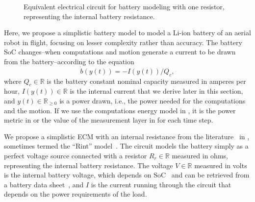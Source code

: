 \begin{figure}[h!]
  \sfr
  \centering
  \selectfont
  
  \caption[Equivalent electrical circuit for battery modeling with an internal resistance]{Equivalent electrical circuit for battery modeling with one resistor, representing the internal battery resistance.}
  \label{fig:rint}
  \efr
\end{figure}
Here, we propose a simplistic battery model to model a Li-ion battery of an aerial robot in flight, focusing on lesser complexity rather than accuracy. The battery SoC changes--when computations and motion generate a current to be drawn from the battery--according to the equation~\citep{zhang2018online,hasan2018exogenous}
\begin{equation}\label{eq:socevol}
  \dot{b}(y(t))=-I(y(t))/Q_c,
\end{equation}
where $Q_c\in\mathbb{R}$ is the battery constant nominal capacity measured in amperes per hour, $I(y(t))\in\mathbb{R}$ is the internal current that we derive later in this section, and $y(t)\in\mathbb{R}_{\geq 0}$ is a power drawn, i.e., the power needed for the computations and the motion. 
If we use the computations energy model in , it is the power metric in  or the value of the measurement layer in  for each time step.

We propose a simplistic ECM with an internal resistance from the literature~\citep{mousavi2014various,hinz2019comparison,he2011evaluation} in , sometimes termed the ``Rint'' model~\citep{hinz2019comparison,he2011evaluation}. The circuit models the battery simply as a perfect voltage source connected with a resistor $R_r\in\mathbb{R}$ measured in ohms, representing the internal battery resistance. The voltage $V\in\mathbb{R}$ measured in volts is the internal battery voltage, which depends on SoC~\citep{hasan2018exogenous} and can be retrieved from a battery data sheet~\citep{hinz2019comparison}, and $I$ is the current running through the circuit that depends on the power requirements of the load.

